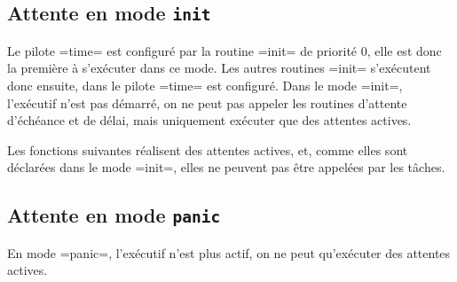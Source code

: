 
\subsection{Attente en mode \texttt{init}}

Le pilote \plm=time= est configuré par la routine \plm=init= de priorité $0$, elle est donc la première à s'exécuter dans ce mode. Les autres routines \plm=init= s'exécutent donc ensuite, dans le pilote \plm=time= est configuré. Dans le mode \plm=init=, l'exécutif n'est pas démarré, on ne peut pas appeler les routines d'attente d'échéance et de délai, mais uniquement exécuter que des attentes actives.

Les fonctions suivantes réalisent des attentes actives, et, comme elles sont déclarées dans le mode \plm=init=, elles ne peuvent pas être appelées par les tâches.




\subsection{Attente en mode \texttt{panic}}

En mode \plm=panic=, l'exécutif n'est plus actif, on ne peut qu'exécuter des attentes actives.















